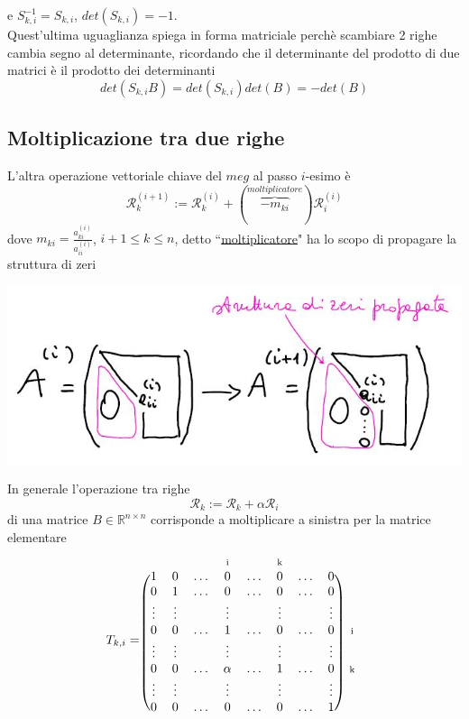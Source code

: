 \documentclass[12pt,a4paper]{article}
\newcommand{\matindex}[1]{\mbox{\scriptsize#1}}%
\begin{document}
e \quad $S^{-1}_{k,i}=S_{k,i}$, \quad   $det(S_{k,i})=-1$.\\Quest'ultima uguaglianza spiega in forma matriciale perchè scambiare 2 righe cambia segno al determinante, ricordando che il determinante del prodotto di due matrici è il prodotto dei determinanti 
\begin{equation*}
    det(S_{k,i}B)=det(S_{k,i})det(B)=-det(B)
\end{equation*}

\subsection{Moltiplicazione tra due righe}
L'altra operazione vettoriale chiave del $meg$ al passo $i$-esimo è
\begin{equation*}
    \mathcal{R}^{(i+1)}_k:=\mathcal{R}^{(i)}_k+(\overbrace{-m_{ki}}^{moltiplicatore})\mathcal{R}^{(i)}_i
\end{equation*}
dove $m_{ki}=\frac{a_{ki}^{(i)}}{a_{ii}^{(i)}}$, $i+1\leq k\leq n$, detto ``\uline{moltiplicatore}" ha lo scopo di propagare la struttura di zeri
\begin{center}
    \includegraphics[scale=0.5]{lez22_pag6.JPG}    
\end{center}
In generale l'operazione tra righe
\begin{equation*}
    \mathcal{R}_k:=\mathcal{R}_k+\alpha\mathcal{R}_i
\end{equation*}
di una matrice $B\in\mathbb{R}^{n\times n}$ corrisponde a moltiplicare a sinistra per la matrice elementare
\[
    T_{k,i}=\begin{blockarray}{ccccccccc}
    & & & \matindex{i} & &  \matindex{k} & & \\
        \begin{block}{(cccccccc)c}
        1 & 0 & \dots & 0 & \dots & 0 & \dots & 0 \\
        0 & 1 & \dots & 0 & \dots & 0 & \dots & 0 \\
        \vdots & \vdots &  & \vdots &  & \vdots &  & \vdots \\
        0 & 0 & \dots & 1 & \dots & 0 & \dots & 0 & \matindex{i} \\
        \vdots & \vdots &  & \vdots &  & \vdots &  & \vdots \\
        0 & 0 & \dots & \alpha & \dots & 1 & \dots & 0 & \matindex{k} \\
        \vdots & \vdots &  & \vdots &  & \vdots &  & \vdots \\
        0 & 0 & \dots & 0 & \dots & 0 & \dots & 1 \\
        \end{block}
    \end{blockarray}
\]
\end{document}
